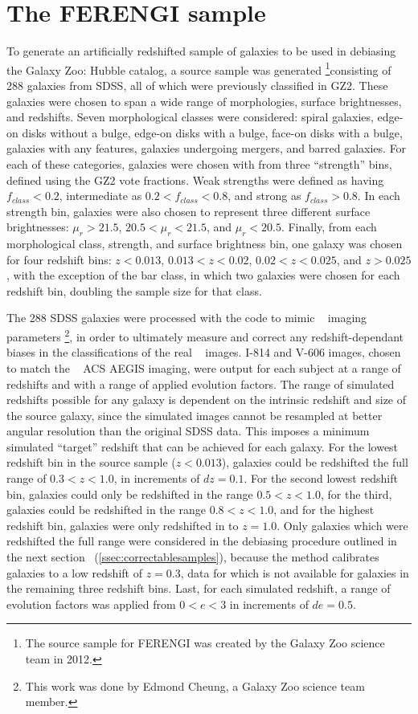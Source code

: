 \section{The FERENGI sample}
\label{sec:ferengi1sample}

To generate an artificially redshifted sample of galaxies to be used in debiasing the Galaxy Zoo: Hubble catalog, a source sample was generated \footnote{The source sample for FERENGI was created by the Galaxy Zoo science team in 2012.}consisting of 288 galaxies from SDSS, all of which were previously classified in GZ2. These galaxies were chosen to span a wide range of morphologies, surface brightnesses, and redshifts. Seven morphological classes were considered: spiral galaxies, edge-on disks without a bulge, edge-on disks with a bulge, face-on disks with a bulge, galaxies with any features, galaxies undergoing mergers, and barred galaxies. For each of these categories, galaxies were chosen with from three ``strength'' bins, defined using the GZ2 vote fractions. Weak strengths were defined as having $f_{class}<0.2$, intermediate as $0.2<f_{class}<0.8$, and strong as $f_{class}>0.8$. In each strength bin, galaxies were also chosen to represent three different surface brightnesses: $\mu_{r}>21.5$, $20.5<\mu_{r}<21.5$, and $\mu_{r}<20.5$. Finally, from each morphological class, strength, and surface brightness bin, one galaxy was chosen for four redshift bins: $z<0.013$, $0.013<z<0.02$, $0.02<z<0.025$, and $z>0.025$, with the exception of the bar class, in which two galaxies were chosen for each redshift bin, doubling the sample size for that class.


The 288 SDSS galaxies were processed with the \ferengi{} code to mimic \hst~ imaging parameters \footnote{This work was done by Edmond Cheung, a Galaxy Zoo science team member.}, in order to ultimately measure and correct any redshift-dependant biases in the classifications of the real \hst~ images. I-814 and V-606 images, chosen to match the \hst~ ACS AEGIS imaging, were output for each subject at a range of redshifts and with a range of applied evolution factors. The range of simulated redshifts possible for any galaxy is dependent on the intrinsic redshift and size of the source galaxy, since the simulated images cannot be resampled at better angular resolution than the original SDSS data. This imposes a minimum simulated ``target'' redshift that can be achieved for each galaxy. For the lowest redshift bin in the source sample ($z<0.013$), galaxies could be redshifted the full range of $0.3<z<1.0$, in increments of $dz=0.1$. For the second lowest redshift bin, galaxies could only be redshifted in the range $0.5<z<1.0$, for the third, galaxies could be redshifted in the range $0.8<z<1.0$, and for the highest redshift bin, galaxies were only redshifted in \ferengi{} to $z=1.0$. Only galaxies which were redshifted the full range were considered in the debiasing procedure outlined in the next section~ (\ref{ssec:correctablesamples}), because the method calibrates galaxies to a low redshift of $z=0.3$, data for which is not available for galaxies in the remaining three redshift bins. Last, for each simulated redshift, a range of evolution factors was applied from $0<e<3$ in increments of $de=0.5$. 

